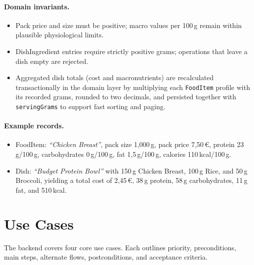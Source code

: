 \documentclass[11pt]{article}
\begin{document}
\paragraph{Domain invariants.}
\begin{itemize}[noitemsep]
  \item Pack price and size must be positive; macro values per 100\,g remain within plausible physiological limits.
  \item DishIngredient entries require strictly positive grams; operations that leave a dish empty are rejected.
  \item Aggregated dish totals (cost and macronutrients) are recalculated transactionally in the domain layer by multiplying each \texttt{FoodItem} profile with its recorded grams, rounded to two decimals, and persisted together with \texttt{servingGrams} to support fast sorting and paging.
\end{itemize}

\paragraph{Example records.}
\begin{itemize}[noitemsep]
  \item FoodItem: \emph{``Chicken Breast''}, pack size 1{,}000\,g, pack price 7{,}50\,€, protein 23\,g/100\,g, carbohydrates 0\,g/100\,g, fat 1{,}5\,g/100\,g, calories 110\,kcal/100\,g.
  \item Dish: \emph{``Budget Protein Bowl''} with 150\,g Chicken Breast, 100\,g Rice, and 50\,g Broccoli, yielding a total cost of 2{,}45\,€, 38\,g protein, 58\,g carbohydrates, 11\,g fat, and 510\,kcal.
\end{itemize}

\section{Use Cases}

The backend covers four core use cases. Each outlines priority, preconditions, main steps, alternate flows, postconditions, and acceptance criteria.
\end{document}
